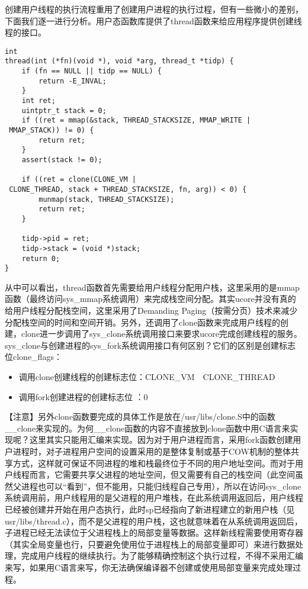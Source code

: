 创建用户线程的执行流程重用了创建用户进程的执行过程，但有一些微小的差别，下面我们逐一进行分析。用户态函数库提供了thread函数来给应用程序提供创建线程的接口。

\begin{lstlisting}
int
thread(int (*fn)(void *), void *arg, thread_t *tidp) {
    if (fn == NULL || tidp == NULL) {
        return -E_INVAL;
    }
    int ret;
    uintptr_t stack = 0;
    if ((ret = mmap(&stack, THREAD_STACKSIZE, MMAP_WRITE | MMAP_STACK)) != 0) {
        return ret;
    }
    assert(stack != 0);

    if ((ret = clone(CLONE_VM | CLONE_THREAD, stack + THREAD_STACKSIZE, fn, arg)) < 0) {
        munmap(stack, THREAD_STACKSIZE);
        return ret;
    }

    tidp->pid = ret;
    tidp->stack = (void *)stack;
    return 0;
}
\end{lstlisting}

从中可以看出，thread函数首先需要给用户线程分配用户栈，这里采用的是mmap函数（最终访问sys\_mmap系统调用）来完成栈空间分配。其实ucore并没有真的给用户线程分配栈空间，这里采用了Demanding
Paging（按需分页）技术来减少分配栈空间的时间和空间开销。另外，还调用了clone函数来完成用户线程的创建，clone进一步调用了sys\_clone系统调用接口来要求ucore完成创建线程的服务。sys\_clone与创建进程的sys\_fork系统调用接口有何区别？它们的区别是创建标志位clone\_flags：

\begin{itemize}
\item
  调用clone创建线程的创建标志位：CLONE\_VM~\textbar{}~CLONE\_THREAD
\item
  调用fork创建进程的创建标志位 ：0
\end{itemize}

【注意】另外clone函数要完成的具体工作是放在/usr/libs/clone.S中的函数\_\_clone来实现的。为何\_\_clone函数的内容不直接放到clone函数中用C语言来实现呢？这里其实只能用汇编来实现。因为对于用户进程而言，采用fork函数创建用户进程时，对子进程用户空间的设置采用的是整体复制或基于COW机制的整体共享方式，这样就可保证不同进程的堆和栈最终位于不同的用户地址空间。而对于用户线程而言，它需要共享父进程的地址空间，但又需要有自己的栈空间（此空间虽然父进程也可以``看到''，但不能用，只能归线程自己专用），所以在访问sys\_clone系统调用前，用户线程用的是父进程的用户堆栈，在此系统调用返回后，用户线程已经被创建并开始在用户态执行，此时sp已经指向了新进程建立的新用户栈（见usr/libs/thread.c），而不是父进程的用户栈，这也就意味着在从系统调用返回后，子进程已经无法读位于父进程栈上的局部变量等数据。这样新线程需要使用寄存器（其实全局变量也行，只要避免使用位于进程栈上的局部变量即可）来进行数据处理，完成用户线程的继续执行。为了能够精确控制这个执行过程，不得不采用汇编来写，如果用C语言来写，你无法确保编译器不创建或使用局部变量来完成处理过程。

